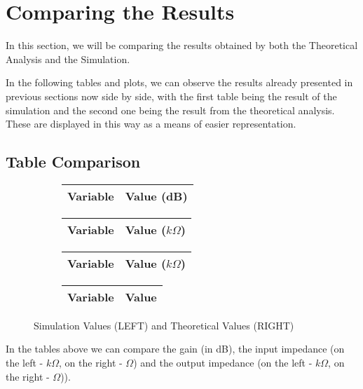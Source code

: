 \clearpage

\section{Comparing the Results}
\label{sec:comparing}

In this section, we will be comparing the results obtained by both the Theoretical Analysis and the Simulation.

In the following tables and plots, we can observe the results already presented in previous sections now side by side, with the first table being the result of the simulation and the second one being the result from the theoretical analysis. These are displayed in this
way as a means of easier representation.

\subsection{Table Comparison}


\begin{figure}[ht]
\centering
\begin{subfigure}{.5\textwidth}
  \centering
  \begin{tabular}{|l|r|}
  \hline    
  {\bf Variable} & {\bf Value (dB)} \\ \hline
  
  \end{tabular}
  \begin{tabular}{|l|r|}
  \hline    
  {\bf Variable} & {\bf Value ($k\Omega$)} \\ \hline
  
 \end{tabular}
 \begin{tabular}{|l|r|}
  \hline    
  {\bf Variable} & {\bf Value ($k\Omega$)} \\ \hline
  
  \end{tabular}
\end{subfigure}%
\begin{subfigure}{.4\textwidth}
  \centering
  \begin{tabular}{|l|r|}
  \hline    
  {\bf Variable} & {\bf Value} \\ \hline
  
  \end{tabular}
\end{subfigure}
\caption{Simulation Values (LEFT) and Theoretical Values (RIGHT)}
\label{fig:sbs1}
\end{figure}


In the tables above we can compare the gain (in dB), the input impedance (on the left - $k\Omega$, on the right - $\Omega$) and the output impedance (on the left - $k\Omega$, on the right - $\Omega$)).

